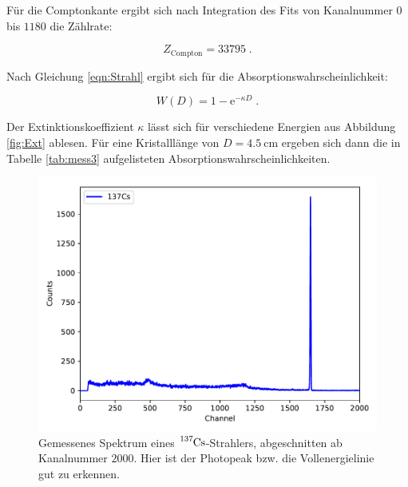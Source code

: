 Für die Comptonkante ergibt sich nach Integration des Fits von Kanalnummer $\num{0}$ bis $\num{1180}$ 
die Zählrate:

\begin{equation*}
  Z_\text{Compton} = \num{33795} \; .
\end{equation*}

Nach Gleichung \eqref{eqn:Strahl} ergibt sich für die Absorptionswahrscheinlichkeit:

\begin{equation}
  W(D) = 1 - \text{e}^{- \kappa D} \; .
\end{equation}

Der Extinktionskoeffizient $\kappa$ lässt sich für verschiedene Energien aus Abbildung \ref{fig:Ext} ablesen.
Für eine Kristalllänge von $D = \SI{4.5}{\centi\meter}$ ergeben sich dann die in Tabelle \ref{tab:mess3}
aufgelisteten Absorptionswahrscheinlichkeiten.


\begin{figure}[H]
  \centering
  \includegraphics[scale=0.55]{content/plot2.pdf}
  \caption{Gemessenes Spektrum eines $\ce{^{137}Cs}$-Strahlers, abgeschnitten ab Kanalnummer $\num{2000}$. Hier ist der
  Photopeak bzw. die Vollenergielinie gut zu erkennen.}
  \label{fig:plot2}
\end{figure}

